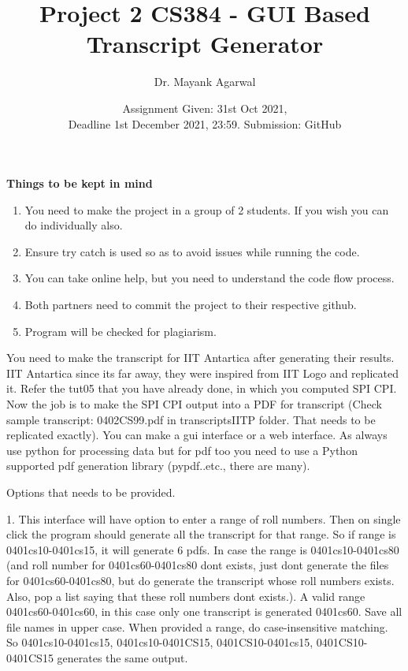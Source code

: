 \documentclass{article}
\title{Project 2 CS384 -   GUI Based Transcript Generator }
\author{Dr. Mayank Agarwal}
\date{Assignment Given: 31st Oct 2021,\\ Deadline 1st December 2021,  
23:59. Submission: GitHub }
\begin{document}
	\maketitle  
	\textbf{Things to be kept in mind} 
	\begin{enumerate}
\item You need to make the project in a group of 2 students. If you wish you 
can do individually also.  

\item Ensure try catch is used so as to avoid issues while running the code. 

\item You can take online help, but you need to understand the code flow 
process.

\item Both partners need to commit the project to their respective github. 
\item Program will be checked for plagiarism.   
\end{enumerate}


You need to make the transcript for IIT Antartica after generating their 
results.  IIT Antartica since its far away, they were inspired from IIT Logo 
and replicated it. Refer the tut05 that you have already done, in which you
computed SPI CPI. Now 
the job is to make the SPI CPI output into a PDF for transcript (Check sample 
transcript: 0402CS99.pdf in 	transcriptsIITP folder. That needs to be 
replicated exactly). You can make a 
gui interface or a web interface. As always use python for processing  data but 
for pdf too you need to use a Python supported pdf generation library 
(pypdf..etc., there are many).

Options that needs to be provided. 

1. This 
interface will have option to enter a range of roll numbers. Then on single 
click the program should generate  all the transcript for that range. So if 
range is 0401cs10-0401cs15, it will generate 6 pdfs. In case the range is 
0401cs10-0401cs80 (and roll number for 0401cs60-0401cs80 dont exists, just dont 
generate the files for 0401cs60-0401cs80, but do generate the transcript whose 
roll numbers exists. Also, pop a list saying that these roll numbers dont 
exists.). A valid range 0401cs60-0401cs60, in this case only one transcript is 
generated 0401cs60. Save all file names in upper case. When provided a range, 
do case-insensitive matching. So  0401cs10-0401cs15,  0401cs10-0401CS15,  
0401CS10-0401cs15,  0401CS10-0401CS15 generates the same output. 
\end{document}

